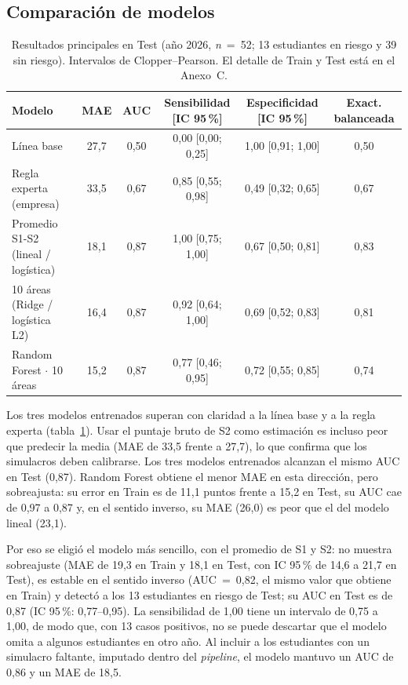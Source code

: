 \documentclass[10pt,letterpaper,twocolumn]{article}
\begin{document}
\subsection{Comparación de modelos}

\begin{table}[!t]
\centering
\small
\begin{tabular}{@{}lccccc@{}}
\toprule
\textbf{Modelo} & \textbf{MAE} & \textbf{AUC} & \textbf{Sensibilidad [IC 95\,\%]} & \textbf{Especificidad [IC 95\,\%]} & \textbf{Exact. balanceada} \\
\midrule
Línea base & 27,7 & 0,50 & 0,00 [0,00; 0,25] & 1,00 [0,91; 1,00] & 0,50 \\
Regla experta (empresa) & 33,5 & 0,67 & 0,85 [0,55; 0,98] & 0,49 [0,32; 0,65] & 0,67 \\
Promedio S1-S2 (lineal / logística) & 18,1 & 0,87 & 1,00 [0,75; 1,00] & 0,67 [0,50; 0,81] & 0,83 \\
10 áreas (Ridge / logística L2) & 16,4 & 0,87 & 0,92 [0,64; 1,00] & 0,69 [0,52; 0,83] & 0,81 \\
Random Forest $\cdot$ 10 áreas & 15,2 & 0,87 & 0,77 [0,46; 0,95] & 0,72 [0,55; 0,85] & 0,74 \\
\bottomrule
\end{tabular}
\caption{Resultados principales en Test (año 2026, \textit{n}~=~52; 13 estudiantes en riesgo y 39 sin riesgo). Intervalos de Clopper--Pearson. El detalle de Train y Test está en el Anexo~C.}
\label{tb:resultados}
\end{table}

Los tres modelos entrenados superan con claridad a la línea base y a la regla experta (tabla~\ref{tb:resultados}). Usar el puntaje bruto de S2 como estimación es incluso peor que predecir la media (MAE de 33,5 frente a 27,7), lo que confirma que los simulacros deben calibrarse. Los tres modelos entrenados alcanzan el mismo AUC en Test (0,87). Random Forest obtiene el menor MAE en esta dirección, pero sobreajusta: su error en Train es de 11,1 puntos frente a 15,2 en Test, su AUC cae de 0,97 a 0,87 y, en el sentido inverso, su MAE (26,0) es peor que el del modelo lineal (23,1).

Por eso se eligió el modelo más sencillo, con el promedio de S1 y S2: no muestra sobreajuste (MAE de 19,3 en Train y 18,1 en Test, con IC 95\,\% de 14,6 a 21,7 en Test), es estable en el sentido inverso (AUC~=~0,82, el mismo valor que obtiene en Train) y detectó a los 13 estudiantes en riesgo de Test; su AUC en Test es de 0,87 (IC 95\,\%: 0,77--0,95). La sensibilidad de 1,00 tiene un intervalo de 0,75 a 1,00, de modo que, con 13 casos positivos, no se puede descartar que el modelo omita a algunos estudiantes en otro año. Al incluir a los estudiantes con un simulacro faltante, imputado dentro del \textit{pipeline}, el modelo mantuvo un AUC de 0,86 y un MAE de 18,5.
\end{document}
